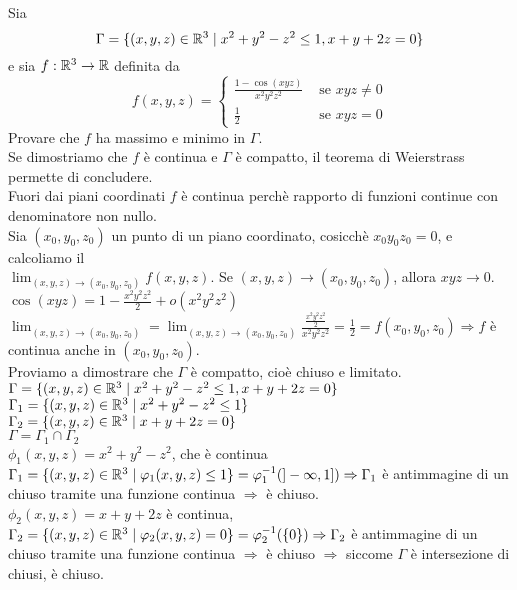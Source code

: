 \begin{exbar}
\begin{example}
	
	Sia 
	\begin{equation*}
		\Gamma=\{(x,y,z)\in\mathbb{R}^3\mid x^2+y^2-z^2\leq 1, x+y+2z=0\} 
	\end{equation*}
	e sia $f:\mathbb{R}^3\rightarrow \mathbb{R} $ definita da 
	\begin{equation*}
		f(x,y,z)=\begin{cases}
			\frac{1-\cos(xyz)}{x^2y^2z^2}&\text{  se  }xyz\neq 0\\
			\frac{1}{2}&\text{  se  }xyz= 0
		\end{cases}
	\end{equation*}
	Provare che $f$ ha massimo e minimo in $\Gamma$.\\
	Se dimostriamo che $f$ è continua e $\Gamma$ è compatto, il teorema di Weierstrass permette di concludere.\\
	Fuori dai piani coordinati $f$ è continua perchè rapporto di funzioni continue con denominatore non nullo.\\
	Sia $(x_0,y_0,z_0)$ un punto di un piano coordinato, cosicchè $x_0y_0z_0=0$, e calcoliamo il\\ $\lim_{(x,y,z)\rightarrow(x_0,y_0,z_0)}f(x,y,z)$. Se $(x,y,z)\rightarrow(x_0,y_0,z_0)$, allora $xyz\rightarrow0$.\\
	$\cos(xyz)=1-\frac{x^2y^2z^2}{2}+o(x^2y^2z^2)$\\
	$\lim_{(x,y,z)\rightarrow(x_0,y_0,z_0)}=\lim_{(x,y,z)\rightarrow(x_0,y_0,z_0)}\frac{\frac{x^2y^2z^2}{2}}{x^2y^2z^2}=\frac{1}{2}=f(x_0,y_0,z_0) \Rightarrow f$ è continua anche in $(x_0,y_0,z_0)$.\\
	Proviamo a dimostrare che $\Gamma$ è compatto, cioè chiuso e limitato. \\
	$\Gamma=\{(x,y,z)\in\mathbb{R}^3\mid x^2+y^2-z^2\leq 1, x+y+2z=0\} $\\
	$\Gamma_1=\{(x,y,z)\in\mathbb{R}^3\mid x^2+y^2-z^2\leq 1\}$\\
	$\Gamma_2=\{(x,y,z)\in\mathbb{R}^3\mid x+y+2z=0\}$\\
	$\Gamma=\Gamma_1\cap\Gamma_2$   \\
	$\phi_1(x,y,z)=x^2+y^2-z^2$, che è continua $\Gamma_1=\{(x,y,z)\in\mathbb{R}^3\mid \varphi_1(x,y,z)\leq 1\}=\varphi_1^{-1}(]-\infty,1])\Rightarrow \Gamma_1$ è antimmagine di un chiuso tramite una funzione continua $\Rightarrow$ è chiuso.\\
	$\phi_2(x,y,z)=x+y+2z$ è continua, $\Gamma_2=\{(x,y,z)\in\mathbb{R}^3\mid \varphi_2(x,y,z)= 0\}=\varphi_2^{-1}(\{0\})\Rightarrow\Gamma_2$ è antimmagine di un chiuso tramite una funzione continua $\Rightarrow$ è chiuso $\Rightarrow$ siccome $\Gamma$ è intersezione di chiusi, è chiuso.\\

\end{example}
\end{exbar}
